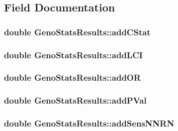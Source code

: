 \subsection{Field Documentation}
\hypertarget{structGenoStatsResults_ae8171c259ef70ff74c60d4b9bfaa8f66}{
\subsubsection[{addCStat}]{\setlength{\rightskip}{0pt plus 5cm}double {\bf GenoStatsResults::addCStat}}}
\label{structGenoStatsResults_ae8171c259ef70ff74c60d4b9bfaa8f66}
\hypertarget{structGenoStatsResults_ada26e3e65a779adf42d6598df522f22c}{
\subsubsection[{addLCI}]{\setlength{\rightskip}{0pt plus 5cm}double {\bf GenoStatsResults::addLCI}}}
\label{structGenoStatsResults_ada26e3e65a779adf42d6598df522f22c}
\hypertarget{structGenoStatsResults_a789a736b74e427c069ce2cf4642fe465}{
\subsubsection[{addOR}]{\setlength{\rightskip}{0pt plus 5cm}double {\bf GenoStatsResults::addOR}}}
\label{structGenoStatsResults_a789a736b74e427c069ce2cf4642fe465}
\hypertarget{structGenoStatsResults_a33e9c29e3701709217756dadcec9e43d}{
\subsubsection[{addPVal}]{\setlength{\rightskip}{0pt plus 5cm}double {\bf GenoStatsResults::addPVal}}}
\label{structGenoStatsResults_a33e9c29e3701709217756dadcec9e43d}
\hypertarget{structGenoStatsResults_a6ac0807bd05fcf31d48d8192aa095883}{
\subsubsection[{addSensNNRN}]{\setlength{\rightskip}{0pt plus 5cm}double {\bf GenoStatsResults::addSensNNRN}}}
